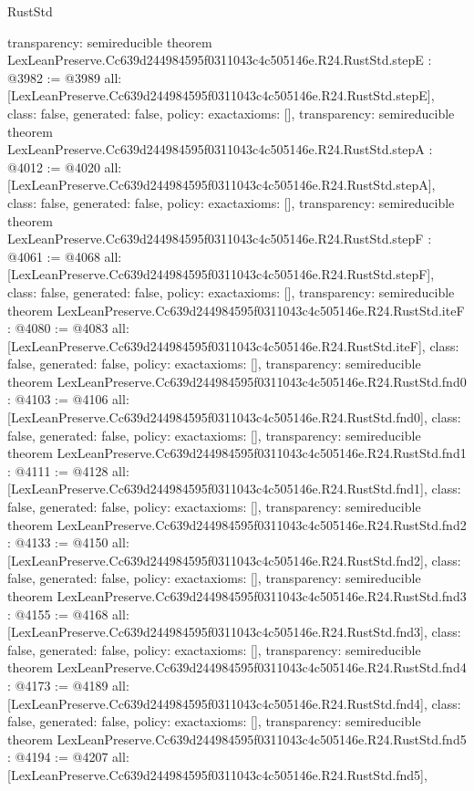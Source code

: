 \begin{lexlean}{RustStd}
\begin{coremodule}
{  transparency: semireducible
}
theorem LexLeanPreserve.Cc639d244984595f0311043c4c505146e.R24.RustStd.stepE : @3982 := @3989 {
  all: [LexLeanPreserve.Cc639d244984595f0311043c4c505146e.R24.RustStd.stepE],
  class: false,
  generated: false,
  policy: exact{axioms: []},
  transparency: semireducible
}
theorem LexLeanPreserve.Cc639d244984595f0311043c4c505146e.R24.RustStd.stepA : @4012 := @4020 {
  all: [LexLeanPreserve.Cc639d244984595f0311043c4c505146e.R24.RustStd.stepA],
  class: false,
  generated: false,
  policy: exact{axioms: []},
  transparency: semireducible
}
theorem LexLeanPreserve.Cc639d244984595f0311043c4c505146e.R24.RustStd.stepF : @4061 := @4068 {
  all: [LexLeanPreserve.Cc639d244984595f0311043c4c505146e.R24.RustStd.stepF],
  class: false,
  generated: false,
  policy: exact{axioms: []},
  transparency: semireducible
}
theorem LexLeanPreserve.Cc639d244984595f0311043c4c505146e.R24.RustStd.iteF : @4080 := @4083 {
  all: [LexLeanPreserve.Cc639d244984595f0311043c4c505146e.R24.RustStd.iteF],
  class: false,
  generated: false,
  policy: exact{axioms: []},
  transparency: semireducible
}
theorem LexLeanPreserve.Cc639d244984595f0311043c4c505146e.R24.RustStd.fnd0 : @4103 := @4106 {
  all: [LexLeanPreserve.Cc639d244984595f0311043c4c505146e.R24.RustStd.fnd0],
  class: false,
  generated: false,
  policy: exact{axioms: []},
  transparency: semireducible
}
theorem LexLeanPreserve.Cc639d244984595f0311043c4c505146e.R24.RustStd.fnd1 : @4111 := @4128 {
  all: [LexLeanPreserve.Cc639d244984595f0311043c4c505146e.R24.RustStd.fnd1],
  class: false,
  generated: false,
  policy: exact{axioms: []},
  transparency: semireducible
}
theorem LexLeanPreserve.Cc639d244984595f0311043c4c505146e.R24.RustStd.fnd2 : @4133 := @4150 {
  all: [LexLeanPreserve.Cc639d244984595f0311043c4c505146e.R24.RustStd.fnd2],
  class: false,
  generated: false,
  policy: exact{axioms: []},
  transparency: semireducible
}
theorem LexLeanPreserve.Cc639d244984595f0311043c4c505146e.R24.RustStd.fnd3 : @4155 := @4168 {
  all: [LexLeanPreserve.Cc639d244984595f0311043c4c505146e.R24.RustStd.fnd3],
  class: false,
  generated: false,
  policy: exact{axioms: []},
  transparency: semireducible
}
theorem LexLeanPreserve.Cc639d244984595f0311043c4c505146e.R24.RustStd.fnd4 : @4173 := @4189 {
  all: [LexLeanPreserve.Cc639d244984595f0311043c4c505146e.R24.RustStd.fnd4],
  class: false,
  generated: false,
  policy: exact{axioms: []},
  transparency: semireducible
}
theorem LexLeanPreserve.Cc639d244984595f0311043c4c505146e.R24.RustStd.fnd5 : @4194 := @4207 {
  all: [LexLeanPreserve.Cc639d244984595f0311043c4c505146e.R24.RustStd.fnd5],
}
\end{coremodule}
\end{lexlean}
